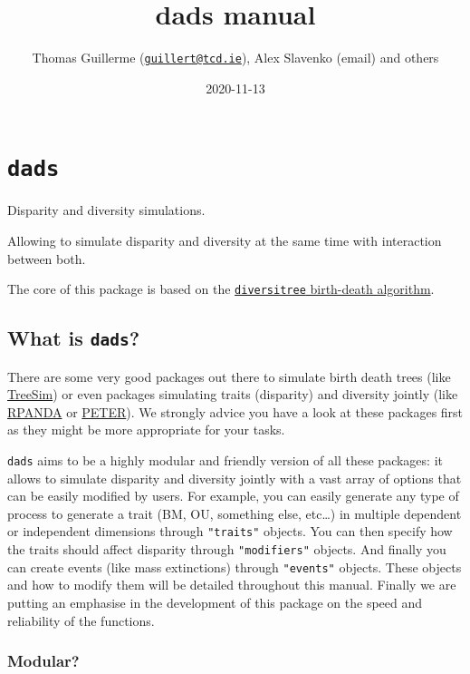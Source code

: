 \documentclass[]{book}
\title{dads manual}
\author{Thomas Guillerme (\href{mailto:guillert@tcd.ie}{\nolinkurl{guillert@tcd.ie}}), Alex Slavenko (email) and others}
\date{2020-11-13}
\begin{document}
\maketitle

{
\setcounter{tocdepth}{1}
\tableofcontents
}
\hypertarget{dads}{%
\chapter{\texorpdfstring{\texttt{dads}}{dads}}\label{dads}}

Disparity and diversity simulations.

Allowing to simulate disparity and diversity at the same time with interaction between both.

The core of this package is based on the \href{https://github.com/cran/diversitree/blob/master/R/simulate-bd.R}{\texttt{diversitree} birth-death algorithm}.

\hypertarget{what-is-dads}{%
\section{\texorpdfstring{What is \texttt{dads}?}{What is dads?}}\label{what-is-dads}}

There are some very good packages out there to simulate birth death trees (like \href{https://github.com/tanja819/TreeSim}{TreeSim}) or even packages simulating traits (disparity) and diversity jointly (like \href{https://github.com/cran/RPANDA}{RPANDA} or \href{https://github.com/PuttickMacroevolution/PETER}{PETER}).
We strongly advice you have a look at these packages first as they might be more appropriate for your tasks.

\texttt{dads} aims to be a highly modular and friendly version of all these packages: it allows to simulate disparity and diversity jointly with a vast array of options that can be easily modified by users.
For example, you can easily generate any type of process to generate a trait (BM, OU, something else, etc\ldots{}) in multiple dependent or independent dimensions through \texttt{"traits"} objects.
You can then specify how the traits should affect disparity through \texttt{"modifiers"} objects. And finally you can create events (like mass extinctions) through \texttt{"events"} objects.
These objects and how to modify them will be detailed throughout this manual.
Finally we are putting an emphasise in the development of this package on the speed and reliability of the functions.

\hypertarget{modular}{%
\subsection{Modular?}\label{modular}}
\end{document}
